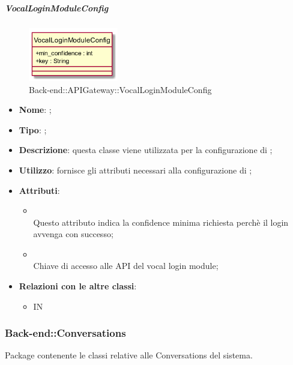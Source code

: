 \hypertarget{VocalLoginModuleConfig_label}{\subparagraph{VocalLoginModuleConfig}}
\begin{figure}[h]
	\centering
	\includegraphics[width=0.35\textwidth,height=\textheight,keepaspectratio]{images/ClassVocalLoginModuleConfig.png}
	\caption{Back-end::APIGateway::VocalLoginModuleConfig}
\end{figure}
\begin{itemize}
	\item \textbf{Nome}: ;
	\item \textbf{Tipo}: ;
	\item \textbf{Descrizione}: questa classe viene utilizzata per la configurazione di ;
	\item \textbf{Utilizzo}: fornisce gli attributi necessari alla configurazione di ;
	\item \textbf{Attributi}:
	\begin{itemize}
		\item[]  \\
		Questo attributo indica la confidence minima richiesta perchè il login avvenga con successo;
		\item[]  \\
		Chiave di accesso alle API del vocal login module;
	\end{itemize}
	\item \textbf{Relazioni con le altre classi}:
	\begin{itemize}
		\item IN \hyperlink{VocalLoginMicrosoftModule_label}{}
	\end{itemize}
\end{itemize}
\FloatBarrier

\subsubsection{Back-end::Conversations}
Package contenente le classi relative alle Conversations del sistema.
